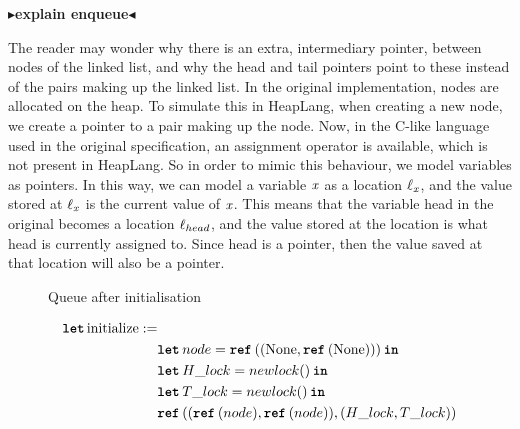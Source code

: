 \documentclass[twoside,11pt,openright]{report}
\newcommand{\initialise}{\operatorname{initialize}}
\newcommand{\todo}[1]{{\color[rgb]{.5,0,0}\textbf{$\blacktriangleright$#1$\blacktriangleleft$}}}
\begin{document}
\todo{explain enqueue}

The reader may wonder why there is an extra, intermediary pointer, between nodes of the linked list, and why the head and tail pointers point to these instead of the pairs making up the linked list. In the original implementation, nodes are allocated on the heap. To simulate this in HeapLang, when creating a new node, we create a pointer to a pair making up the node. Now, in the C-like language used in the original specification, an assignment operator is available, which is not present in HeapLang. So in order to mimic this behaviour, we model variables as pointers. In this way, we can model a variable $\mathit{x}$ as a location $\ell_{\mathit{x}}$, and the value stored at $\ell_{\mathit{x}}$ is the current value of $\mathit{x}$. This means that the variable head in the original becomes a location $\ell_{head}$, and the value stored at the location is what head is currently assigned to. Since head is a pointer, then the value saved at that location will also be a pointer.



\begin{figure}[h]
  \centering
  \caption{Queue after initialisation}
  \label{MSQTL:impl:figure:init}
\end{figure}

\begin{align*}
  \langkw{let} \initialise := &\\
                    & \Let node = \Ref((\None, \Ref(\None))) in\\
                    & \Let H\_lock = newlock \TT in\\
                    & \Let T\_lock = newlock \TT in\\
                    & \Ref ((\Ref(node), \Ref(node)), (H\_lock, T\_lock))
\end{align*}
\end{document}
